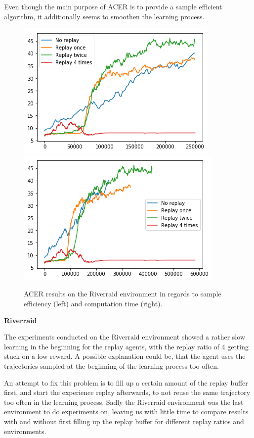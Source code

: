 Even though the main purpose of ACER is to provide a sample efficient algorithm, it additionally seems to smoothen the learning process.
\begin{figure}[h]
\includegraphics[scale=0.55]{bilder/riverraidbyonline.png}
\includegraphics[scale=0.55]{bilder/riverraidbytime.png}
\caption{ACER results on the Riverraid environment in regards to sample efficiency (left) and computation time (right).}

\end{figure}

\textbf{Riverraid}

The experiments conducted on the Riverraid environment showed a rather slow learning in the beginning for the replay agents, with the replay ratio of 4 getting stuck on a low reward. A possible explanation could be, that the agent uses the trajectories sampled at the beginning of the learning process too often.

An attempt to fix this problem is to fill up a certain amount of the replay buffer first, and start the experience replay afterwards, to not reuse the same trajectory too often in the learning process. Sadly the Riverraid environment was the last environment to do experiments on, leaving us with little time to compare results with and without first filling up the replay buffer for different replay ratios and environments.

